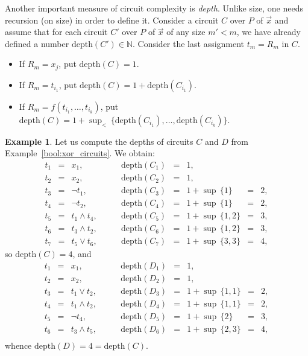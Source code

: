 \documentclass[12pt,notitlepage]{article}
\theoremstyle{plain}
\theoremstyle{definition}
\newtheorem{exm}[thm]{Example}
\theoremstyle{plain}
\newcommand{\N}{\mathbb{N}}
\newcommand{\1}{\mathbf{1}}
\newcommand{\0}{\mathbf{0}}
\begin{document}
Another important measure of circuit complexity is \emph{depth}. Unlike size, one needs recursion (on size) in order to define it. Consider a circuit $C$ over $P$ of $\vec x$ and assume that for each circuit $C'$ over $P$ of $\vec x$ of any size $m' < m$, we have already defined a number $\mathrm{depth}(C') \in \N$. Consider the last assignment $t_m = R_m$ in $C$.
\begin{itemize}
\item If $R_m = x_j$, put $\mathrm{depth}(C) = 1$.
\item If $R_m = t_{i_1}$, put $\mathrm{depth}(C) = 1 + \mathrm{depth}(C_{i_1})$.
\item If $R_m = f(t_{i_1},\ldots, t_{i_k})$, put $\mathrm{depth}(C) = 1 + \sup_{<}\, \{ \mathrm{depth}(C_{i_1}), \ldots, \mathrm{depth}(C_{i_k}) \}$.
\end{itemize}

\begin{exm}
Let us compute the depths of circuits $C$ and $D$ from Example~\ref{bool:xor_circuits}. We obtain:
$$
\begin{array}{rclrclcl}
t_1 &=& x_1,\qquad &\mathrm{depth}(C_{1}) &=& 1,\\
t_2 &=& x_2,\qquad &\mathrm{depth}(C_{2}) &=& 1,\\
t_3 &=& \neg t_1,\qquad &\mathrm{depth}(C_{3}) &=&  1 + \sup\, \{1\} &=& 2,\\
t_4 &=& \neg t_2,\qquad &\mathrm{depth}(C_{4}) &=&  1 + \sup\, \{1\} &=& 2,\\
t_5 &=& t_1 \wedge t_4,\qquad &\mathrm{depth}(C_{5}) &=&  1 + \sup\, \{1, 2\} &=& 3,\\
t_6 &=& t_3 \wedge t_2,\qquad &\mathrm{depth}(C_{6}) &=&  1 + \sup\, \{1, 2\} &=& 3,\\
t_7 &=& t_5 \vee t_6,\qquad &\mathrm{depth}(C_{7}) &=&  1 + \sup\, \{3, 3\} &=& 4,
\end{array}
$$
so $\mathrm{depth}(C) = 4$, and
$$
\begin{array}{rclrclcl}
t_1 &=& x_1,\qquad &\mathrm{depth}(D_{1}) &=& 1,\\
t_2 &=& x_2,\qquad &\mathrm{depth}(D_{2}) &=& 1,\\
t_3 &=& t_1 \vee t_2,\qquad &\mathrm{depth}(D_3) &=&  1 + \sup\, \{1, 1\} &=& 2,\\
t_4 &=& t_1 \wedge t_2,\qquad &\mathrm{depth}(D_4) &=&  1 + \sup\, \{1, 1\} &=& 2,\\
t_5 &=&\neg t_4,\qquad &\mathrm{depth}(D_5) &=&  1 + \sup\, \{2\} &=& 3,\\
t_6 &=& t_3 \wedge t_5,\qquad &\mathrm{depth}(D_6) &=&  1 + \sup\, \{2, 3\} &=& 4,\\
\end{array}
$$
whence $\mathrm{depth}(D) = 4 = \mathrm{depth}(C)$.
\end{exm}
\end{document}
